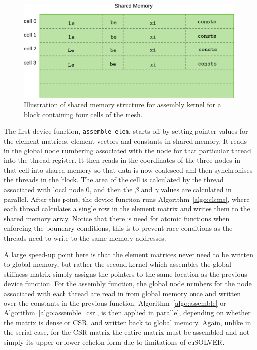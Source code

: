 \begin{figure}
	\centering
	\includegraphics[width = 0.75\linewidth]{Figures/shared_pos}
	\caption{Illustration of shared memory structure for assembly kernel for a block containing four cells of the mesh.}
	\label{fig:shared_mem}
\end{figure}

The first device function, \texttt{assemble\_elem}, starts off by setting pointer values for the element matrices, element vectors and constants in shared memory. It reads in the global node numbering associated with the node for that particular thread into the thread register. It then reads in the coordinates of the three nodes in that cell into shared memory so that data is now coalesced and then synchronises the threads in the block. The area of the cell is calculated by the thread associated with local node 0, and then the $\beta$ and $\gamma$ values are calculated in parallel. After this point, the device function runs Algorithm~\ref{algo:elems}, where each thread calculates a single row in the element matrix and writes them to the shared memory array. Notice that there is need for atomic functions when enforcing the boundary conditions, this is to prevent race conditions as the threads need to write to the same memory addresses. 

A large speed-up point here is that the element matrices never need to be written to global memory, but rather the second kernel which assembles the global stiffness matrix simply assigns the pointers to the same location as the previous device function. For the assembly function, the global node numbers for the node associated with each thread are read in from global memory once and written over the constants in the previous function. Algorithm~\ref{algo:assemble} or Algorithm~\ref{algo:assemble_csr}, is then applied in parallel, depending on whether the matrix is dense or CSR, and written back to global memory. Again, unlike in the serial case, for the CSR matrix the entire matrix must be assembled and not simply its upper or lower-echelon form due to limitations of cuSOLVER.

